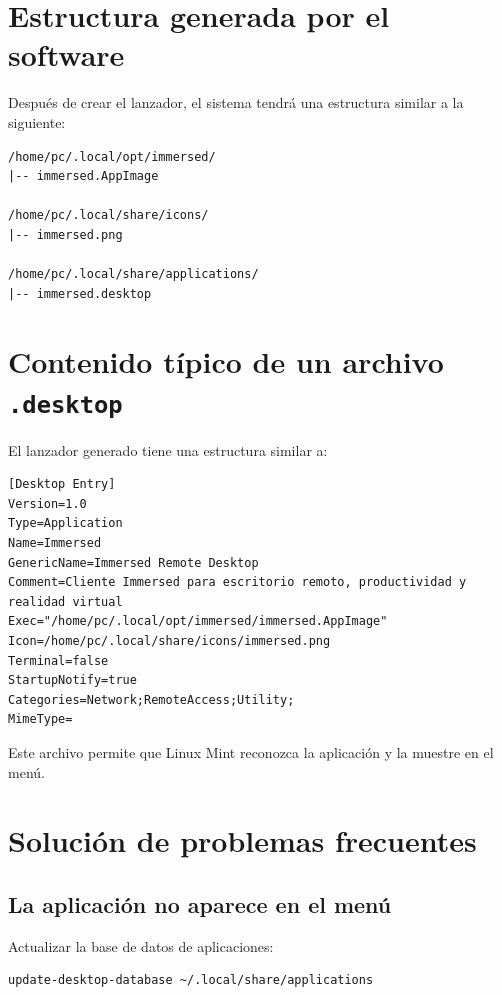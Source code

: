 \documentclass[11pt,a4paper]{article}
\begin{document}
\section{Estructura generada por el software}

Después de crear el lanzador, el sistema tendrá una estructura similar a la siguiente:

\begin{lstlisting}[style=textstyle]
/home/pc/.local/opt/immersed/
|-- immersed.AppImage

/home/pc/.local/share/icons/
|-- immersed.png

/home/pc/.local/share/applications/
|-- immersed.desktop
\end{lstlisting}

\section{Contenido típico de un archivo \texttt{.desktop}}

El lanzador generado tiene una estructura similar a:

\begin{lstlisting}[style=textstyle]
[Desktop Entry]
Version=1.0
Type=Application
Name=Immersed
GenericName=Immersed Remote Desktop
Comment=Cliente Immersed para escritorio remoto, productividad y realidad virtual
Exec="/home/pc/.local/opt/immersed/immersed.AppImage"
Icon=/home/pc/.local/share/icons/immersed.png
Terminal=false
StartupNotify=true
Categories=Network;RemoteAccess;Utility;
MimeType=
\end{lstlisting}

Este archivo permite que Linux Mint reconozca la aplicación y la muestre en el menú.

\section{Solución de problemas frecuentes}

\subsection{La aplicación no aparece en el menú}

Actualizar la base de datos de aplicaciones:

\begin{lstlisting}[style=bashstyle]
update-desktop-database ~/.local/share/applications
\end{lstlisting}
\end{document}
